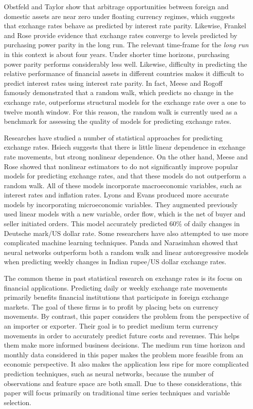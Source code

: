 \documentclass{sig-alternate-05-2015}
\begin{document}
\par{} Obstfeld and Taylor show that arbitrage opportunities between foreign and domestic assets are near zero under floating currency regimes, which suggests that exchange rates behave as predicted by interest rate parity. Likewise, Frankel and Rose provide evidence that exchange rates converge to levels predicted by purchasing power parity in the long run. The relevant time-frame for the \emph{long run} in this context is about four years. Under shorter time horizons, purchasing power parity performs considerably less well. Likewise, difficulty in predicting the relative performance of financial assets in different countries makes it difficult to predict interest rates using interest rate parity. In fact, Meese and Rogoff famously demonstrated that a random walk, which predicts no change in the exchange rate, outperforms structural models for the exchange rate over a one to twelve month window. For this reason, the random walk is currently used as a benchmark for assessing the quality of models for predicting exchange rates.
\par{} Researches have studied a number of statistical approaches for predicting exchange rates. Hsiech suggests that there is little linear dependence in exchange rate movements, but strong nonlinear dependence. On the other hand, Meese and Rose showed that nonlinear estimators to do not significantly improve popular models for predicting exchange rates, and that these models do not outperform a random walk. All of these models incorporate macroeconomic variables, such as interest rates and inflation rates. Lyons and Evans produced more accurate models by incorporating microeconomic variables. They augmented previously used linear models with a new variable, order flow, which is the net of buyer and seller initiated orders. This model accurately predicted 60\% of daily changes in Deutsche mark/US dollar rate. Some researchers have also attempted to use more complicated machine learning techniques. Panda and Narasimhan showed that neural networks outperform both a random walk and linear autoregressive models when predicting weekly changes in Indian rupee/US dollar exchange rates.
\par{} The common theme in past statistical research on exchange rates is its focus on financial applications. Predicting daily or weekly exchange rate movements primarily benefits financial institutions that participate in foreign exchange markets. The goal of these firms is to profit by placing bets on currency movements. By contrast, this paper considers the problem from the perspective of an importer or exporter. Their goal is to predict medium term currency movements in order to accurately predict future costs and revenues. This helps them make more informed business decisions. The medium run time horizon and monthly data considered in this paper makes the problem more feasible from an economic perspective. It also makes the application less ripe for more complicated prediction techniques, such as neural networks, because the number of observations and feature space are both small. Due to these considerations, this paper will focus primarily on traditional time series techniques and variable selection.
\end{document}
